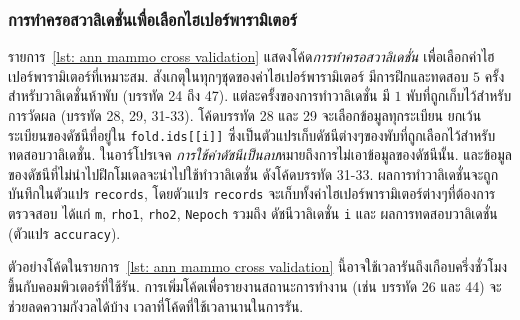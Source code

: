 \subsubsection{การทำครอสวาลิเดชั่นเพื่อเลือกไฮเปอร์พารามิเตอร์}

รายการ~\ref{lst: ann mammo cross validation} แสดงโค้ด\textit{การทำครอสวาลิเดชั่น} 
เพื่อเลือกค่าไฮเปอร์พารามิเตอร์ที่เหมาะสม.
สังเกตุในทุกๆชุดของค่าไฮเปอร์พารามิเตอร์ มีการฝึกและทดสอบ $5$ ครั้งสำหรับวาลิเดชั่นห้าพับ (บรรทัด 24 ถึง 47).
%
แต่ละครั้งของการทำวาลิเดชั่น มี $1$ พับที่ถูกเก็บไว้สำหรับการวัดผล (บรรทัด 28, 29, 31-33).
%
โค้ดบรรทัด 28 และ 29 จะเลือกข้อมูลทุกระเบียน ยกเว้นระเบียนของดัชนีที่อยู่ใน \texttt{fold.ids[[i]]} ซึ่งเป็นตัวแปรเก็บดัชนีต่างๆของพับที่ถูกเลือกไว้สำหรับทดสอบวาลิเดชั่น.
ในอาร์โปรเจค \textit{การใช้ค่าดัชนีเป็นลบ}หมายถึงการไม่เอาข้อมูลของดัชนีนั้น.
และข้อมูลของดัชนีที่ไม่นำไปฝึกโมเดลจะนำไปใช้ทำวาลิเดชั่น ดังโค้ดบรรทัด 31-33.
%
ผลการทำวาลิเดชั่นจะถูกบันทึกในตัวแปร \texttt{records}, 
โดยตัวแปร \texttt{records} จะเก็บทั้งค่าไฮเปอร์พารามิเตอร์ต่างๆที่ต้องการตรวจสอบ ได้แก่ \texttt{m}, \texttt{rho1}, \texttt{rho2}, \texttt{Nepoch} รวมถึง ดัชนีวาลิเดชั่น \texttt{i} และ ผลการทดสอบวาลิเดชั่น (ตัวแปร \texttt{accuracy}).

ตัวอย่างโค้ดในรายการ~\ref{lst: ann mammo cross validation} นี้อาจใช้เวลารันถึงเกือบครึ่งชั่วโมง ขึ้นกับคอมพิวเตอร์ที่ใช้รัน.
การเพิ่มโค้ดเพื่อรายงานสถานะการทำงาน (เช่น บรรทัด 26 และ 44) 
จะช่วยลดความกังวลได้บ้าง เวลาที่โค้ดที่ใช้เวลานานในการรัน.

